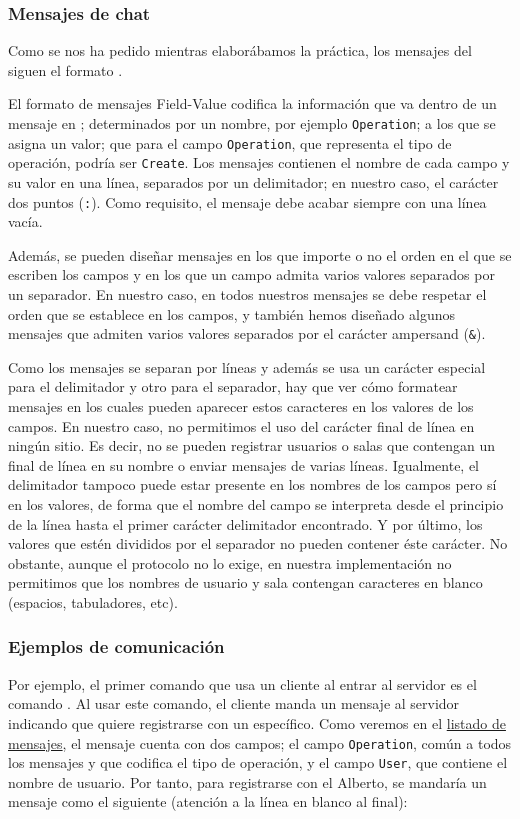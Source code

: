 \subsubsection{Mensajes de chat}
Como se nos ha pedido mientras elaborábamos la práctica, los mensajes del  siguen el formato .

El formato de mensajes Field-Value codifica la información que va dentro de un mensaje en ; determinados por un nombre, por ejemplo \lstinline!Operation!; a los que se asigna un valor; que para el campo \lstinline!Operation!, que representa el tipo de operación, podría ser \lstinline!Create!. Los mensajes contienen el nombre de cada campo y su valor en una línea, separados por un delimitador; en nuestro caso, el carácter dos puntos (\lstinline!:!). Como requisito, el mensaje debe acabar siempre con una línea vacía.

Además, se pueden diseñar mensajes en los que importe o no el orden en el que se escriben los campos y en los que un campo admita varios valores separados por un separador. En nuestro caso, en todos nuestros mensajes se debe respetar el orden que se establece en los campos, y también hemos diseñado algunos mensajes que admiten varios valores separados por el carácter ampersand (\lstinline{&}).

Como los mensajes se separan por líneas y además se usa un carácter especial para el delimitador y otro para el separador, hay que ver cómo formatear mensajes en los cuales pueden aparecer estos caracteres en los valores de los campos. En nuestro caso, no permitimos el uso del carácter final de línea en ningún sitio. Es decir, no se pueden registrar usuarios o salas que contengan un final de línea en su nombre o enviar mensajes de varias líneas. Igualmente, el delimitador tampoco puede estar presente en los nombres de los campos pero sí en los valores, de forma que el nombre del campo se interpreta desde el principio de la línea hasta el primer carácter delimitador encontrado. Y por último, los valores que estén divididos por el separador no pueden contener éste carácter. No obstante, aunque el protocolo no lo exige, en nuestra implementación no permitimos que los nombres de usuario y sala contengan caracteres en blanco (espacios, tabuladores, etc).

\subsubsection*{Ejemplos de comunicación}
Por ejemplo, el primer comando que usa un cliente al entrar al servidor es el comando . Al usar este comando, el cliente manda un mensaje al servidor indicando que quiere registrarse con un  específico. Como veremos en el \hyperref[sec:listado]{listado de mensajes}, el mensaje  cuenta con dos campos; el campo \lstinline{Operation}, común a todos los mensajes y que codifica el tipo de operación, y el campo \lstinline!User!, que contiene el nombre de usuario. Por tanto, para registrarse con el  Alberto, se mandaría un mensaje como el siguiente (atención a la línea en blanco al final):

